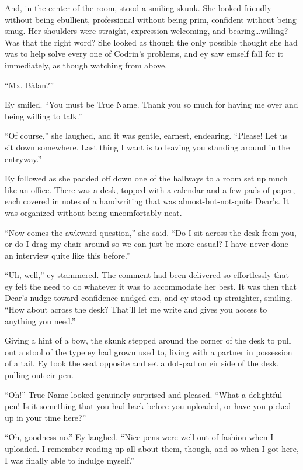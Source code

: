 And, in the center of the room, stood a smiling skunk. She looked friendly without being ebullient, professional without being prim, confident without being smug. Her shoulders were straight, expression welcoming, and bearing\ldots willing? Was that the right word? She looked as though the only possible thought she had was to help solve every one of Codrin's problems, and ey saw emself fall for it immediately, as though watching from above.

``Mx. Bălan?''

Ey smiled. ``You must be True Name. Thank you so much for having me over and being willing to talk.''

``Of course,'' she laughed, and it was gentle, earnest, endearing. ``Please! Let us sit down somewhere. Last thing I want is to leaving you standing around in the entryway.''

Ey followed as she padded off down one of the hallways to a room set up much like an office. There was a desk, topped with a calendar and a few pads of paper, each covered in notes of a handwriting that was almost-but-not-quite Dear's. It was organized without being uncomfortably neat.

``Now comes the awkward question,'' she said. ``Do I sit across the desk from you, or do I drag my chair around so we can just be more casual? I have never done an interview quite like this before.''

``Uh, well,'' ey stammered. The comment had been delivered so effortlessly that ey felt the need to do whatever it was to accommodate her best. It was then that Dear's nudge toward confidence nudged em, and ey stood up straighter, smiling. ``How about across the desk? That'll let me write and gives you access to anything you need.''

Giving a hint of a bow, the skunk stepped around the corner of the desk to pull out a stool of the type ey had grown used to, living with a partner in possession of a tail. Ey took the seat opposite and set a dot-pad on eir side of the desk, pulling out eir pen.

``Oh!'' True Name looked genuinely surprised and pleased. ``What a delightful pen! Is it something that you had back before you uploaded, or have you picked up in your time here?''

``Oh, goodness no.'' Ey laughed. ``Nice pens were well out of fashion when I uploaded. I remember reading up all about them, though, and so when I got here, I was finally able to indulge myself.''


